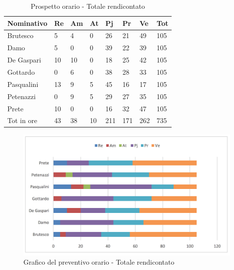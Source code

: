 							\begin{table}[H] \begin{center} \begin{tabular}{llllllll}
							\toprule
							\textbf{Nominativo}		&	\textbf{Re}	&	\textbf{Am}	&	\textbf{At}	&	\textbf{Pj}	&	\textbf{Pr}	&	\textbf{Ve}	&	\textbf{Tot}\\
							\midrule
							Brutesco	&	5	&	4	&	0	&	26	&	21	&	49	&	105	 \\
							Damo	&	5	&	0	&	0	&	39	&	22	&	39	&	105	 \\
							De Gaspari	&	10	&	10	&	0	&	18	&	25	&	42	&	105	 \\
							Gottardo	&	0	&	6	&	0	&	38	&	28	&	33	&	105	 \\
							Pasqualini	&	13	&	9	&	5	&	45	&	16	&	17	&	105	 \\
							Petenazzi	&	0	&	9	&	5	&	29	&	27	&	35	&	105	 \\
							Prete	&	10	&	0	&	0	&	16	&	32	&	47	&	105	 \\
							\midrule
							Tot in ore	&	43	&	38	&	10	&	211	&	171	&	262	&	735	 \\

							\bottomrule
							\end{tabular} \end{center} \caption{Prospetto orario -
							Totale rendicontato
							}\label{tab:h_TotaleRendicontato} \end{table}		\begin{figure}[H]  \centering  \includegraphics[scale=0.40]{img/h_TotaleRendicontato}
									\caption{Grafico del preventivo orario -								Totale rendicontato	}  \label{fig:h_TotaleRendicontato	} \end{figure}
